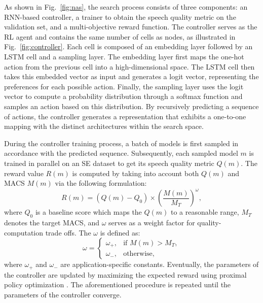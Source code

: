 \documentclass[journal]{IEEEtran}
\begin{document}
As shown in Fig.~\ref{fig:nas}, the search process consists of three components: an RNN-based controller, a trainer to obtain the speech quality metric on the validation set, and a multi-objective reward function. The controller serves as the RL agent and contains the same number of cells as nodes, as illustrated in Fig.~\ref{fig:controller}. Each cell is composed of an embedding layer followed by an LSTM cell and a sampling layer. The embedding layer first maps the one-hot action from the previous cell into a high-dimensional space. The LSTM cell then takes this embedded vector as input and generates a logit vector, representing the preferences for each possible action. Finally, the sampling layer uses the logit vector to compute a probability distribution through a softmax function and samples an action based on this distribution. By recursively predicting a sequence of actions, the controller generates a representation that exhibits a one-to-one mapping with the distinct architectures within the search space. 

During the controller training process, a batch of models is first sampled in accordance with the predicted sequence. Subsequently, each sampled model $m$ is trained in parallel on an SE dataset to get its speech quality metric $Q(m)$. The reward value $R(m)$ is computed by taking into account both $Q(m)$ and MACS $M(m)$ via the following formulation:
\begin{equation}
    R(m)=\left(Q(m)-Q_0\right)\times \left( \frac{M(m)}{M_T} \right)^\omega,
    \label{eq:11}
\end{equation}
where $Q_0$ is a baseline score which maps the $Q(m)$ to a reasonable range, $M_T$ denotes the target MACS, and $\omega$ serves as a weight factor for quality-computation trade offs. The $\omega$ is defined as:
\begin{equation}
    \omega =
    \begin{cases}
        \omega_{+}, & \text{if } M(m) > M_T, \\
        \omega_{-}, & \text{otherwise},
    \end{cases}
\end{equation}
where $\omega_{+}$ and $\omega_{-}$ are application-specific constants. Eventually, the parameters of the controller are updated by maximizing the expected reward using proximal policy optimization \cite{PPO}. The aforementioned procedure is repeated until the parameters of the controller converge.
\end{document}
